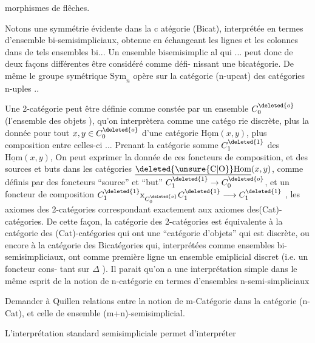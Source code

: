 
morphismes de flêches.

Notons une symmétrie évidente dans la c atégorie (Bicat), interprétée
en termes d'ensemble bi-semisimpliciaux, obtenue en échangeant les lignes
et les colonnes dans  de tels ensembles bi... Un ensemble bisemisimplic\linebreak
al qui ... peut donc de deux façons différentes être considéré comme défi-\linebreak
nissant une bicatégorie. De même le groupe symétrique $\mathrm{Sym}_n$ opère sur
la catégorie  (n-upcat) des catégories n-uples ..

Une 2-catégorie peut être définie comme constée par un ensemble
 $C^{\deleted{o}}_0$ (l'ensemble des objets ), qu'on interprètera comme une catégo\linebreak
rie discrète, plus la donnée pour tout $x,y \in C^{\deleted{o}}_0$ d'une catégorie $\underline{\mathrm{Hom}}(x,y)$,
plus   composition entre celles\deleted{(}-ci ... Prenant la catégorie somme  $C^{\deleted{1}}_1$
des $\underline{\mathrm{Hom}}(x,y)$, On peut exprimer la donnée de ces foncteurs de composition,
et des sources et buts  dans les catégories $\underline{\deleted{\unsure{\mathrm{C}|\mathrm{O}}}\mathrm{Hom}}(x,y)$, comme définis par
des foncteurs ``source'' et ``but'' $C^{\deleted{1}}_1 \to C^{\deleted{o}}_0$, et un foncteur de composition
$C^{\deleted{1}}_1 \mathrm{x}_{C^{\deleted{o}}_0} C^{\deleted{1}}_1 \longrightarrow C^{\deleted{1}}_1$ , les axiomes des 2-catégories correspondant exactement aux
axiomes des(Cat)-catégories. De cette façon, la catégorie des 2-catégories
est équivalente à la catégorie des (Cat)-catégories qui ont une ``catégorie
d'objets'' qui est discrète, ou encore à la catégorie des Bicatégories
qui, interprétées comme ensembles bi-semisimpliciaux, ont  comme
première ligne un ensemble emiplicial discret (i.e. un foncteur cons-\linebreak
tant sur $\Delta$ ). Il parait qu'on a une interprétation simple dans le même
esprit de la notion de n-catégorie en termes d'ensembles n-semi-simpliciaux

 Demander à Quillen relations entre la notion de m-Catégorie dans
la catégorie (n-Cat), et celle de ensemble (m+n)-semisimplicial.\linebreak
{}

L'interprétation standard semisimpliciale permet d'interpréter

